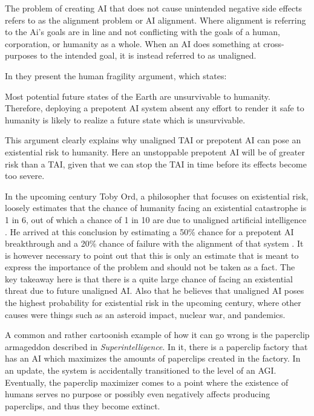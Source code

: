 \documentclass[12pt,A4]{report}
\theoremstyle{definition}
\begin{document}
The problem of creating AI that does not cause unintended negative side effects refers to as the alignment problem or AI alignment. Where alignment is referring to the Ai's goals are in line and not conflicting with the goals of a human, corporation, or humanity as a whole. When an AI does something at cross-purposes to the intended goal, it is instead referred to as unaligned.


In \autocite{Critch Kruger} they present the human fragility argument, which states: 
\begin{displayquote}
  Most potential future states of the Earth are unsurvivable to humanity. Therefore, deploying a prepotent AI system absent any effort to render it safe to humanity is likely to realize a future state which is unsurvivable. 
\end{displayquote}
This argument clearly explains why unaligned TAI or prepotent AI can pose an existential risk to humanity. Here an unstoppable prepotent AI will be of greater risk than a TAI, given that we can stop the TAI in time before its effects become too severe.

In the upcoming century Toby Ord, a philosopher that focuses on existential risk, loosely estimates that the chance of humanity facing an existential catastrophe is 1 in 6, out of which a chance of 1 in 10 are due to unaligned artificial intelligence \autocite{precipice}. He arrived at this conclusion by estimating a 50\% chance for a prepotent AI breakthrough and a 20\% chance of failure with the alignment of that system \autocite{rationally speaking}. It is however necessary to point out that this is only an estimate that is meant to express the importance of the problem and should not be taken as a fact. The key takeaway here is that there is a quite large chance of facing an existential threat due to future unaligned AI. Also that he believes that unaligned AI poses the highest probability for existential risk in the upcoming century, where other causes were things such as an asteroid impact, nuclear war, and pandemics. 

A common and rather cartoonish example of how it can go wrong is the paperclip armageddon described in \textit{Superintelligence}. In it, there is a paperclip factory that has an AI which maximizes the amounts of paperclips created in the factory. In an update, the system is accidentally transitioned to the level of an AGI. Eventually, the paperclip maximizer comes to a point where the existence of humans serves no purpose or possibly even negatively affects producing paperclips, and thus they become extinct. 
\end{document}
